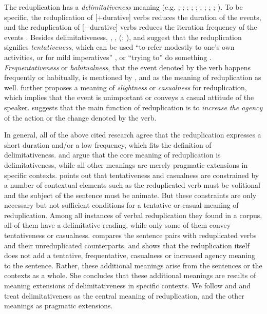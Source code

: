 The reduplication has a \textit{delimitativeness} meaning (e.g. \citealt[204--205]{Chao1968}; \citealt[232]{LiThompson1981};  \citealt[14]{Li1996}; \citealt[70]{Dai1997};  \citealt[382--383]{Zhu1998}; \citealt[420--421]{Xing2000}; \citealt[48]{Chen2001};  \citealt[288]{Tsao2001}; \citealt[11--12]{Yang2003}; \citealt[Sec. 4.3]{XiaoMcEnery2004}). 
To be specific, the reduplication of [$+$durative] verbs reduces the duration of the events,
and the reduplication of [$-$durative] verbs reduces the iteration frequency of the events \citetext{\citealp[14]{Li1996}; \citealp[149--150]{XiaoMcEnery2004}}.
Besides delimitativeness, \citet[204]{Chao1968}, \citet[276]{Fan1964}, \citeauthor{Smith1991} (\citeyear[356]{Smith1991}; \citeyear[199--120]{Smith1994}), \citet[14]{Li1996} and \citet[290--291]{Tsao2001} suggest that the reduplication signifies \textit{tentativeness}, which can be used
``to refer modestly to one's own activities, or for mild imperatives'' \citep[356]{Smith1991}, or ``trying to'' do something \citep[234]{LiThompson1981}.
\textit{Frequentativeness} or \textit{habitualness}, that the event denoted by the verb happens frequently or habitually, is mentioned by \citet[276]{Fan1964}, \citet[15]{Li1996} and \citet[1]{Qian2000} as the meaning of reduplication as well.
 \citet[276]{Fan1964} further proposes a meaning of \textit{slightness} or \textit{casualness} for reduplication, which implies that the event is unimportant or conveys a casual attitude of the speaker.
 \citet[Sec. 3.1.3]{Zhu1998} suggests that the main function of reduplication is to \textit{increase the agency} of the action or the change denoted by the verb.


In general, all of the above cited research agree that the reduplication expresses a short duration and/or a low frequency, which fits the definition of delimitativeness.
\citet[152--154]{XiaoMcEnery2004} and \citet{Yang2003} argue that the core meaning of reduplication is delimitativeness, 
while all other meanings are merely pragmatic extensions  in specific contexts.
\citet[152--154]{XiaoMcEnery2004} points out that tentativeness and casualness are constrained by a number of contextual elements 
such as the reduplicated verb must be volitional and the subject of the sentence must be animate.
But these constraints are only necessary but not sufficient conditions for a tentative or casual meaning of reduplication.
Among all instances of verbal reduplication they found in a corpus, all of them have a delimitative reading, while only some of them convey tentativeness or casualness.
\citet{Yang2003} compares the sentence pairs with reduplicated verbs and their unreduplicated counterparts,
and shows that the reduplication itself does not add a tentative, frequentative, casualness or increased agency meaning to the sentence.
Rather, these additional meanings arise from the sentences or the contexts as a whole.
She concludes that these additional meanings are results of meaning extensions of delimitativeness in specific contexts.
We follow \citet{XiaoMcEnery2004} and \citet{Yang2003} and treat delimitativeness as the central meaning of reduplication,
and the other meanings as pragmatic extensions.

